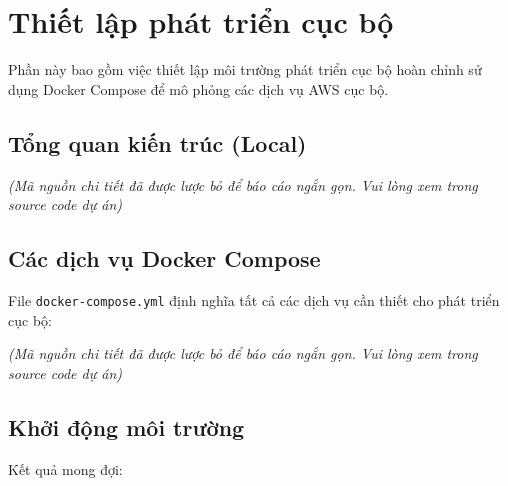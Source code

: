 \hypertarget{thiux1ebft-lux1eadp-phuxe1t-triux1ec3n-cux1ee5c-bux1ed9}{%
\section{Thiết lập phát triển cục
bộ}}

Phần này bao gồm việc thiết lập môi trường phát triển cục bộ hoàn chỉnh
sử dụng Docker Compose để mô phỏng các dịch vụ AWS cục bộ.

\hypertarget{tux1ed5ng-quan-kiux1ebfn-truxfac-local}{%
\subsection{Tổng quan kiến trúc
(Local)}}

\emph{(Mã nguồn chi tiết đã được lược bỏ để báo cáo ngắn gọn. Vui lòng
xem trong source code dự án)}

\hypertarget{cuxe1c-dux1ecbch-vux1ee5-docker-compose}{%
\subsection{Các dịch vụ Docker
Compose}}

File \texttt{docker-compose.yml} định nghĩa tất cả các dịch vụ cần thiết
cho phát triển cục bộ:

\emph{(Mã nguồn chi tiết đã được lược bỏ để báo cáo ngắn gọn. Vui lòng
xem trong source code dự án)}

\hypertarget{khux1edfi-ux111ux1ed9ng-muxf4i-trux1b0ux1eddng}{%
\subsection{Khởi động môi
trường}}

\begin{Shaded}
\begin{Highlighting}[]


\end{Highlighting}
\end{Shaded}

Kết quả mong đợi:

